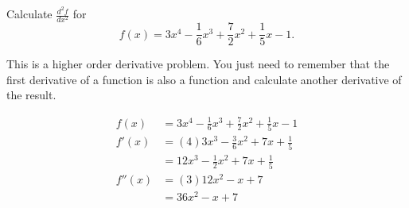 \documentclass{ximera}
\author{Emma Smith Zbarsky}
\begin{document}
\begin{exercise}

Calculate $\frac{d^2f}{dx^2}$ for
\[f(x) = 3x^4-\frac{1}{6}x^3+\frac{7}{2}x^2+\frac{1}{5}x-1.\]


\begin{hint}
This is a higher order derivative problem. You just need to remember
that the first derivative of a function is also a function and calculate
another derivative of the result.
\end{hint}


\begin{hint}
\begin{align*}
f(x) &= 3x^4-\frac{1}{6}x^3+\frac{7}{2}x^2+\frac{1}{5}x-1 \\
f'(x) &= (4)3x^3-\frac{3}{6}x^2+7x+\frac{1}{5} \\
&= 12x^3-\frac{1}{2}x^2+7x+\frac{1}{5} \\
f''(x) &= (3)12x^2-x+7 \\
&= 36x^2-x+7
\end{align*}
\end{hint}


\begin{multipleChoice}
\end{multipleChoice}

\end{exercise}
\end{document}
